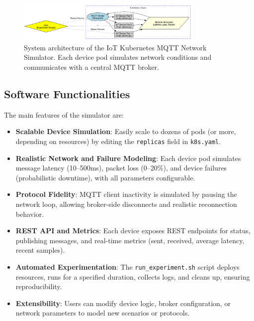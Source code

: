\documentclass[review]{elsarticle}
\begin{document}
\begin{figure}[h]
\centering
\includegraphics[width=0.8\textwidth]{system_architecture.png}
\caption{System architecture of the IoT Kubernetes MQTT Network Simulator. Each device pod simulates network conditions and communicates with a central MQTT broker.}
\label{fig:system-arch}
\end{figure}

\subsection{Software Functionalities}
The main features of the simulator are:
\begin{itemize}
    \item \textbf{Scalable Device Simulation}: Easily scale to dozens of pods (or more, depending on resources) by editing the \texttt{replicas} field in \texttt{k8s.yaml}.
    \item \textbf{Realistic Network and Failure Modeling}: Each device pod simulates message latency (10--500ms), packet loss (0--20\%), and device failures (probabilistic downtime), with all parameters configurable.
    \item \textbf{Protocol Fidelity}: MQTT client inactivity is simulated by pausing the network loop, allowing broker-side disconnects and realistic reconnection behavior.
    \item \textbf{REST API and Metrics}: Each device exposes REST endpoints for status, publishing messages, and real-time metrics (sent, received, average latency, recent samples).
    \item \textbf{Automated Experimentation}: The \texttt{run\_experiment.sh} script deploys resources, runs for a specified duration, collects logs, and cleans up, ensuring reproducibility.
    \item \textbf{Extensibility}: Users can modify device logic, broker configuration, or network parameters to model new scenarios or protocols.
\end{itemize}
\end{document}
